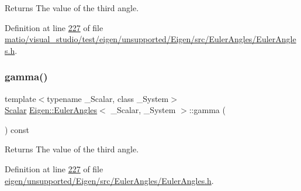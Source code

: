 \begin{DoxyReturn}{Returns}
The value of the third angle. 
\end{DoxyReturn}


Definition at line \hyperlink{matio_2visual__studio_2test_2eigen_2unsupported_2_eigen_2src_2_euler_angles_2_euler_angles_8h_source_l00227}{227} of file \hyperlink{matio_2visual__studio_2test_2eigen_2unsupported_2_eigen_2src_2_euler_angles_2_euler_angles_8h_source}{matio/visual\+\_\+studio/test/eigen/unsupported/\+Eigen/src/\+Euler\+Angles/\+Euler\+Angles.\+h}.

\mbox{\label{class_eigen_1_1_euler_angles_aa75a5f16105d96eedf81bf9f8e789e21}} 
\subsubsection{\texorpdfstring{gamma()}{gamma()}\hspace{0.1cm}{\footnotesize\ttfamily [2/4]}}
{\footnotesize\ttfamily template$<$typename \+\_\+\+Scalar, class \+\_\+\+System$>$ \\
\hyperlink{class_eigen_1_1_euler_angles_a2ab1d433ac9683268446f8905ac31aac}{Scalar} \hyperlink{class_eigen_1_1_euler_angles}{Eigen\+::\+Euler\+Angles}$<$ \+\_\+\+Scalar, \+\_\+\+System $>$\+::gamma (\begin{DoxyParamCaption}{ }\end{DoxyParamCaption}) const\hspace{0.3cm}{\ttfamily [inline]}}

\begin{DoxyReturn}{Returns}
The value of the third angle. 
\end{DoxyReturn}


Definition at line \hyperlink{eigen_2unsupported_2_eigen_2src_2_euler_angles_2_euler_angles_8h_source_l00227}{227} of file \hyperlink{eigen_2unsupported_2_eigen_2src_2_euler_angles_2_euler_angles_8h_source}{eigen/unsupported/\+Eigen/src/\+Euler\+Angles/\+Euler\+Angles.\+h}.

\mbox{\label{class_eigen_1_1_euler_angles_a4c6216fa2fca4d5d70d8f44dae4cf88c}} 
